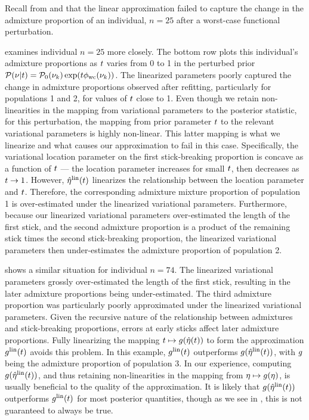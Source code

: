Recall from  and 
that the linear approximation
failed to capture the change in the admixture proportion of an individual,
$n = 25$ after a worst-case functional perturbation.

 examines individual $n = 25$ more closely.
The bottom row plots this individual's
admixture proportions as $t$ varies from 0 to 1 in the perturbed prior
$\mathcal{P}(\nu\vert t) = \mathcal{P}_0(\nu_{k})\exp(t\phi_{\mathrm{wc}}(\nu_{k}))$.
The linearized parameters poorly captured the change in admixture proportions observed after refitting, particularly
for populations 1 and 2, for values of $t$ close to 1.
Even though we retain non-linearities
in the mapping from variational parameters to the posterior statistic,
for this perturbation, the mapping from prior parameter
$t$ to the relevant variational parameters
is highly non-linear.
This latter mapping is what we linearize
and what causes our approximation to fail in this case.
Specifically, the variational location parameter on the first stick-breaking proportion is concave as a function of $t$ ---
the location parameter increases for small $t$,
then decreases as $t\rightarrow1$.
However,
$\hat\eta^{\mathrm{lin}}(t)$ linearizes the relationship between the location parameter and $t$.
Therefore, the corresponding admixture mixture proportion of
population 1 is over-estimated under the linearized variational parameters.
Furthermore, because our linearized variational parameters
over-estimated the length of the first stick,
and the second admixture proportion is a product of the
remaining stick times the second stick-breaking proportion,
the linearized variational parameters then under-estimates
the admixture proportion of population 2.

\StructureLimitationsA

 shows a similar situation for individual $n = 74$.
The linearized variational parameters grossly over-estimated the length of the first stick,
resulting in the later admixture proportions being under-estimated.
The third admixture proportion was particularly poorly approximated under the linearized variational parameters.
Given the recursive nature of the relationship between admixtures and stick-breaking proportions, errors at early sticks affect later admixture proportions.
Fully linearizing the mapping $t\mapsto g(\hat\eta(t))$ to form the approximation
$g^{\mathrm{lin}}(t)$ avoids this problem.
In this example, $g^{\mathrm{lin}}(t)$ outperforms $g(\hat\eta^{\mathrm{lin}}(t))$, with $g$ being the admixture proportion of population 3.
In our experience,
computing $g(\hat\eta^{\mathrm{lin}}(t))$, and thus retaining non-linearities in the mapping from $\eta\mapsto g(\eta)$,
is usually beneficial to the quality of the approximation.
It is likely that $g(\hat\eta^{\mathrm{lin}}(t))$ outperforms $g^{\mathrm{lin}}(t)$ for most posterior quantities,
though as we see in ,
this is not guaranteed to always be true.

\StructureLimitationsB
